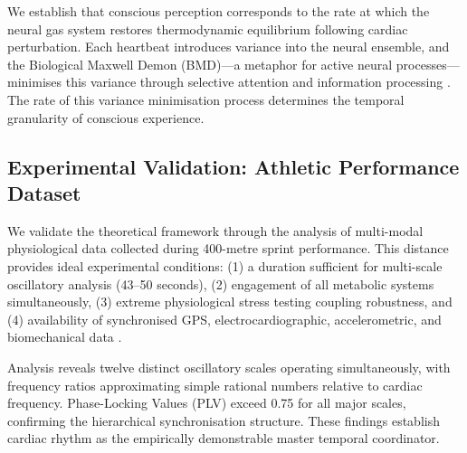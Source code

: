 \documentclass[12pt]{article}
\theoremstyle{remark}
\begin{document}
We establish that conscious perception corresponds to the rate at which the neural gas system restores thermodynamic equilibrium following cardiac perturbation. Each heartbeat introduces variance into the neural ensemble, and the Biological Maxwell Demon (BMD)—a metaphor for active neural processes—minimises this variance through selective attention and information processing \citep{bennett1987demons,sagawa2012thermodynamics}. The rate of this variance minimisation process determines the temporal granularity of conscious experience.

\subsection{Experimental Validation: Athletic Performance Dataset}

We validate the theoretical framework through the analysis of multi-modal physiological data collected during 400-metre sprint performance. This distance provides ideal experimental conditions: (1) a duration sufficient for multi-scale oscillatory analysis (43--50 seconds), (2) engagement of all metabolic systems simultaneously, (3) extreme physiological stress testing coupling robustness, and (4) availability of synchronised GPS, electrocardiographic, accelerometric, and biomechanical data \citep{hausdorff2007gait}.

Analysis reveals twelve distinct oscillatory scales operating simultaneously, with frequency ratios approximating simple rational numbers relative to cardiac frequency. Phase-Locking Values (PLV) exceed 0.75 for all major scales, confirming the hierarchical synchronisation structure. These findings establish cardiac rhythm as the empirically demonstrable master temporal coordinator.
\end{document}
